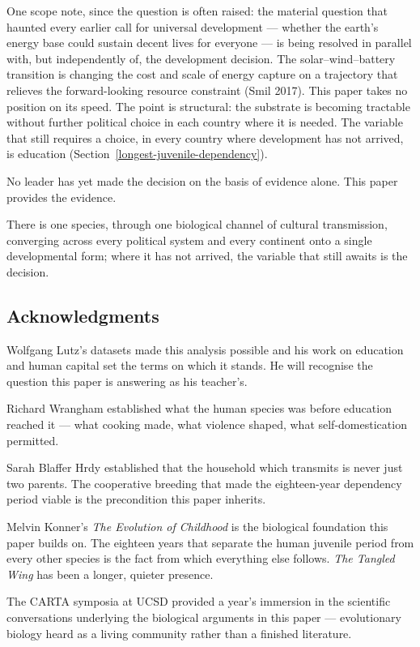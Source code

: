 \documentclass[12pt,letterpaper]{article}
\begin{document}
One scope note, since the question is often raised: the material
question that haunted every earlier call for universal development ---
whether the earth's energy base could sustain decent lives for everyone
--- is being resolved in parallel with, but independently of, the
development decision. The solar--wind--battery transition is changing
the cost and scale of energy capture on a trajectory that relieves the
forward-looking resource constraint (Smil 2017). This paper takes no
position on its speed. The point is structural: the substrate is
becoming tractable without further political choice in each country
where it is needed. The variable that still requires a choice, in every
country where development has not arrived, is education
(Section~\ref{longest-juvenile-dependency}).

No leader has yet made the decision on the basis of evidence alone.
This paper provides the evidence.

There is one species, through one biological channel of cultural
transmission, converging across every political system and every
continent onto a single developmental form; where it has not arrived,
the variable that still awaits is the decision.

\subsection*{Acknowledgments}

Wolfgang Lutz's datasets made this analysis possible and his work on
education and human capital set the terms on which it stands. He will
recognise the question this paper is answering as his teacher's.

Richard Wrangham established what the human species was before
education reached it --- what cooking made, what violence shaped, what
self-domestication permitted.

Sarah Blaffer Hrdy established that the household which transmits is
never just two parents. The cooperative breeding that made the
eighteen-year dependency period viable is the precondition this paper
inherits.

Melvin Konner's \emph{The Evolution of Childhood} is the biological
foundation this paper builds on. The eighteen years that separate the
human juvenile period from every other species is the fact from which
everything else follows. \emph{The Tangled Wing} has been a longer,
quieter presence.

The CARTA symposia at UCSD provided a year's immersion in the
scientific conversations underlying the biological arguments in this
paper --- evolutionary biology heard as a living community rather than
a finished literature.
\end{document}
